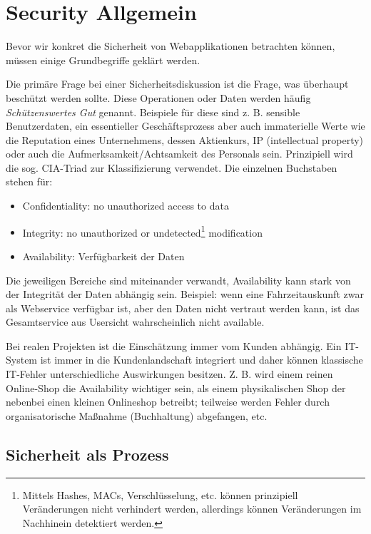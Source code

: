 \chapter{Security Allgemein}

Bevor wir konkret die Sicherheit von Webapplikationen betrachten können, müssen einige Grundbegriffe geklärt werden.

Die primäre Frage bei einer Sicherheitsdiskussion ist die Frage, was überhaupt beschützt werden sollte. Diese Operationen oder Daten werden häufig \textit{Schützenswertes Gut} genannt. Beispiele für diese sind z. B. sensible Benutzerdaten, ein essentieller Geschäftsprozess aber auch immaterielle Werte wie die Reputation eines Unternehmens, dessen Aktienkurs, IP (intellectual property) oder auch die Aufmerksamkeit/Achtsamkeit des Personals sein. Prinzipiell wird die sog. CIA-Triad zur Klassifizierung verwendet. Die einzelnen Buchstaben stehen für:

\begin{itemize}
	\item Confidentiality: no unauthorized access to data
	\item Integrity: no unauthorized or undetected\footnote{Mittels Hashes, MACs, Verschlüsselung, etc. können prinzipiell Veränderungen nicht verhindert werden, allerdings können Veränderungen im Nachhinein detektiert werden.} modification
	\item Availability: Verfügbarkeit der Daten
\end{itemize}

Die jeweiligen Bereiche sind miteinander verwandt, Availability kann stark von der Integrität der Daten abhängig sein. Beispiel: wenn eine Fahrzeitauskunft zwar als Webservice verfügbar ist, aber den Daten nicht vertraut werden kann, ist das Gesamtservice aus Usersicht wahrscheinlich nicht available.

Bei realen Projekten ist die Einschätzung immer vom Kunden abhängig. Ein IT-System ist immer in die Kundenlandschaft integriert und daher können klassische IT-Fehler unterschiedliche Auswirkungen besitzen. Z. B. wird einem reinen Online-Shop die Availability wichtiger sein, als einem physikalischen Shop der nebenbei einen kleinen Onlineshop betreibt; teilweise werden Fehler durch organisatorische Maßnahme (Buchhaltung) abgefangen, etc.

\section{Sicherheit als Prozess}


